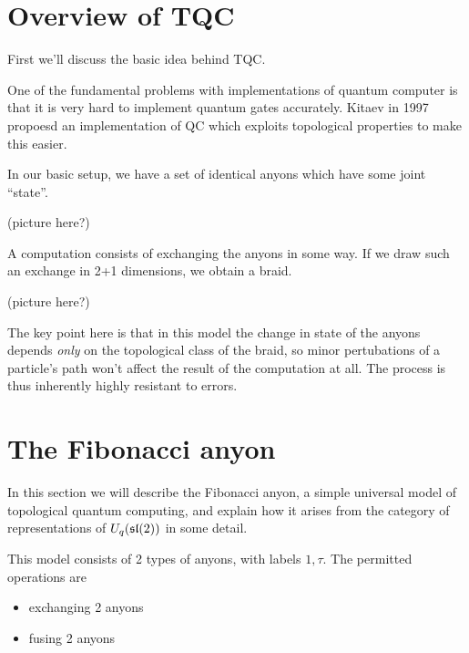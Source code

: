 \section{Overview of TQC}

First we'll discuss the basic idea behind TQC.

One of the fundamental problems with implementations of quantum computer is
that it is very hard to implement quantum gates accurately. Kitaev in 1997
propoesd an implementation of QC which exploits topological properties to make
this easier.

In our basic setup, we have a set of identical anyons which have some joint ``state''.

\begin{center}
    (picture here?)
\end{center}

A computation consists of exchanging the anyons in some way. If we draw such an
exchange in 2+1 dimensions, we obtain a braid. 

\begin{center}
    (picture here?)
\end{center}

The key point here is that in this model the change in state of the anyons
depends \emph{only} on the topological class of the braid, so minor
pertubations of a particle's path won't affect the result of the computation at
all. The process is thus inherently highly resistant to errors. 



\section{The Fibonacci anyon}

In this section we will describe the Fibonacci anyon, a simple universal model
of topological quantum computing, and explain how it arises from the category
of representations of $U_q(\mathfrak{sl}(2))$ in some detail. 

This model consists of 2 types of anyons, with labels $1, \tau$. The permitted
operations are 

\begin{itemize}
    \item exchanging 2 anyons
    \item fusing 2 anyons
\end{itemize}

